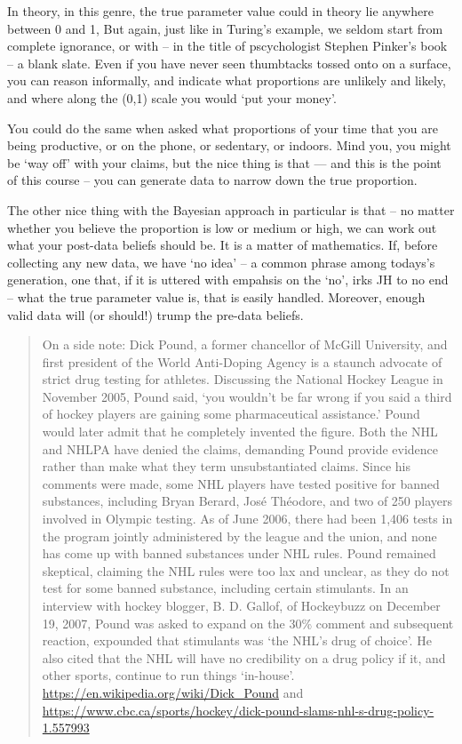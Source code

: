\documentclass[]{book}
\begin{document}
In theory, in this genre, the true parameter value could in theory lie anywhere between 0 and 1, But again, just like in Turing's example, we seldom start from complete ignorance, or with -- in the title of pscychologist Stephen Pinker's book -- a blank slate. Even if you have never seen thumbtacks tossed onto on a surface, you can reason informally, and indicate what proportions are unlikely and likely, and where along the (0,1) scale you would `put your money'.

You could do the same when asked what proportions of your time that you are being productive, or on the phone, or sedentary, or indoors. Mind you, you might be `way off' with your claims, but the nice thing is that --- and this is the point of this course -- you can generate data to narrow down the true proportion.

The other nice thing with the Bayesian approach in particular is that -- no matter whether you believe the proportion is low or medium or high, we can work out what your post-data beliefs should be. It is a matter of mathematics. If, before collecting any new data, we have `no idea' -- a common phrase among todays's generation, one that, if it is uttered with empahsis on the `no', irks JH to no end -- what the true parameter value is, that is easily handled. Moreover, enough valid data will (or should!) trump the pre-data beliefs.

\begin{quote}
On a side note: Dick Pound, a former chancellor of McGill University, and first president of the World Anti-Doping Agency is a staunch advocate of strict drug testing for athletes.
Discussing the National Hockey League in November 2005, Pound said, `you wouldn't be far wrong if you said a third of hockey players are gaining some pharmaceutical assistance.' Pound would later admit that he completely invented the figure. Both the NHL and NHLPA have denied the claims, demanding Pound provide evidence rather than make what they term unsubstantiated claims. Since his comments were made, some NHL players have tested positive for banned substances, including Bryan Berard, José Théodore, and two of 250 players involved in Olympic testing. As of June 2006, there had been 1,406 tests in the program jointly administered by the league and the union, and none has come up with banned substances under NHL rules. Pound remained skeptical, claiming the NHL rules were too lax and unclear, as they do not test for some banned substance, including certain stimulants. In an interview with hockey blogger, B. D. Gallof, of Hockeybuzz on December 19, 2007, Pound was asked to expand on the 30\% comment and subsequent reaction, expounded that stimulants was `the NHL's drug of choice'. He also cited that the NHL will have no credibility on a drug policy if it, and other sports, continue to run things `in-house'. \url{https://en.wikipedia.org/wiki/Dick_Pound} and \url{https://www.cbc.ca/sports/hockey/dick-pound-slams-nhl-s-drug-policy-1.557993}
\end{quote}
\end{document}
